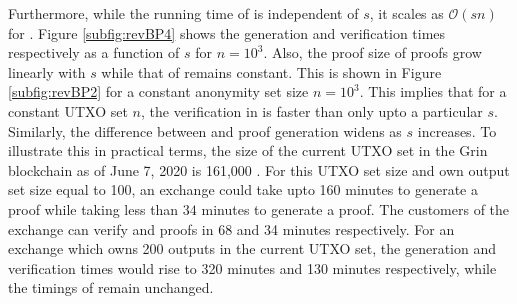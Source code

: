   Furthermore, while the running time of \R is independent of $s$, it scales as $\mathcal{O}(s n)$ for \RBw. 
  Figure \ref{subfig:revBP4} shows the generation and verification times respectively as a function of $s$ for $n=10^3$.  
  Also, the proof size of \RB proofs grow linearly with $s$ while that of \R remains constant.
  This is shown in Figure \ref{subfig:revBP2} for a constant anonymity set size $n=10^3$.
  This implies that for a constant UTXO set $n$, the verification in \RB is faster than \R only upto a particular $s$.
  Similarly, the difference between \RB and \R proof generation widens as $s$ increases.
  To illustrate this in practical terms, the size of the current UTXO set in the Grin blockchain as of June 7, 2020 is 161,000 \cite{GrinScanWebsite}.
  For this UTXO set size and own output set size equal to 100, an exchange could take upto 160 minutes to generate a \RPlus proof while taking less than $34$ minutes to generate a \R proof.
  The customers of the exchange can verify \RB and \R proofs in 68 and 34 minutes respectively.
  For an exchange which owns 200 outputs in the current UTXO set, the \RB generation and verification times would rise to 320 minutes and 130 minutes respectively, while the timings of \R remain unchanged.
  
  
